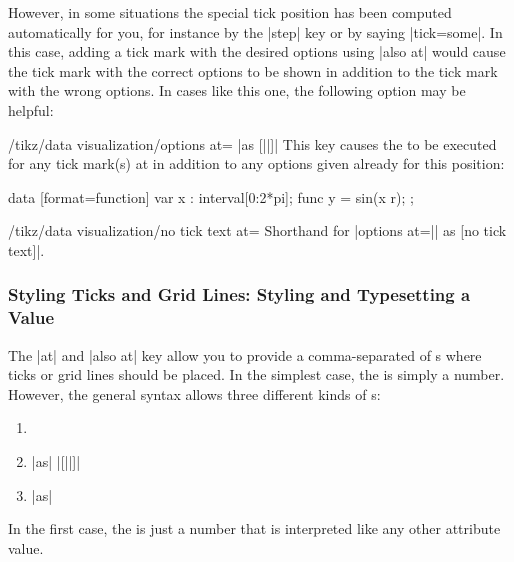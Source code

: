 However, in some situations the special tick position has been computed
automatically for you, for instance by the |step| key or by saying |tick=some|.
In this case, adding a tick mark with the desired options using |also at| would
cause the tick mark with the correct options to be shown in addition to the
tick mark with the wrong options. In cases like this one, the following option
may be helpful:

\begin{key}{/tikz/data visualization/options at= |as [||]|}
    This key causes the  to be executed for any tick mark(s) at
     in addition to any options given already for this position:
\begin{codeexample}[width=7cm]
\tikz \datavisualization [
  scientific axes,
  visualize as smooth line,
  x axis={ticks={major={
    options at = 3    as [no tick text],
    also at    = (pi) as
      [{tick text padding=1ex}] $\pi$}}}]
data [format=function] {
  var x : interval[0:2*pi];
  func y = sin(\value x r);
};
\end{codeexample}
\end{key}

\begin{key}{/tikz/data visualization/no tick text at=}
    Shorthand for |options at=|| as [no tick text]|.
\end{key}


\subsubsection{Styling Ticks and Grid Lines: Styling and Typesetting a Value}
\label{section-dv-local-styles}
\label{section-dv-tick-labels}

The  |at| and |also at| key allow you to provide a
comma-separated  of s where ticks or grid lines should
be placed. In the simplest case, the  is simply a number. However,
the general syntax allows three different kinds of s:
%
\begin{enumerate}
    \item {}
    \item {} |as| |[||]|
    \item {} |as|  
\end{enumerate}

In the first case, the  is just a number that is interpreted like
any other attribute value.


